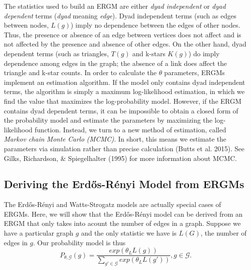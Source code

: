 \documentclass[12pt,twoside]{amherstthesis}
\begin{document}
  The statistics used to build an ERGM are either \emph{dyad independent}
  or \emph{dyad dependent} terms (\emph{dyad} meaning \emph{edge}). Dyad
  independent terms (such as edges between nodes, \(L(g)\)) imply no
  dependence between the edges of other nodes. Thus, the presence or
  absence of an edge between vertices does not affect and is not affected
  by the presence and absence of other edges. On the other hand, dyad
  dependent terms (such as triangles, \(T(g)\) and k-stars \(K(g)\)) do
  imply dependence among edges in the graph; the absence of a link does
  affect the triangle and k-star counts. In order to calculate the
  \(\theta\) parameters, ERGMs implement an estimation algorithm. If the
  model only contains dyad independent terms, the algorithm is simply a
  maximum log-likelihood estimation, in which we find the value that
  maximizes the log-probability model. However, if the ERGM contains dyad
  dependent terms, it can be impossible to obtain a closed form of the
  probability model and estimate the parameters by maximizing the
  log-likelihood function. Instead, we turn to a new method of estimation,
  called \emph{Markov chain Monte Carlo (MCMC)}. In short, this means we
  estimate the parameters via simulation rather than precise calculation
  (Butts et al. 2015). See Gilks, Richardson, \& Spiegelhalter (1995) for
  more information about MCMC.
  
  \subsection{Deriving the Erdős-Rényi Model from
  ERGMs}\label{deriving-the-erdos-renyi-model-from-ergms}
  
  The Erdős-Rényi and Watts-Strogatz models are actually special cases of
  ERGMs. Here, we will show that the Erdős-Rényi model can be derived from
  an ERGM that only takes into acount the number of edges in a graph.
  Suppose we have a particular graph \(g\) and the only statistic we have
  is \(L(G)\), the number of edges in \(g\). Our probability model is thus
  \[P_{\theta, \mathcal{G}}(g) = \frac {exp(\theta_{L}L(g))} {\sum_{g' \in \mathcal{G}}^{} exp(\theta_{L}L(g'))}, g \in \mathcal{G}.\]
  
\end{document}
